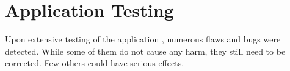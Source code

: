 \section{Application Testing}
Upon extensive testing of the application , numerous flaws and bugs were detected. While some of them do not cause any harm, they still need to be corrected. Few others could have serious effects.
